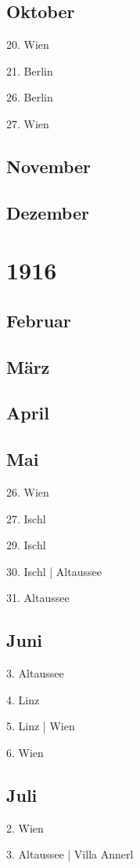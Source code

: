 \documentclass[twoside=false,titlepage=false,open=any, parskip=never, fontsize=10pt, headings=small, chapterprefix=false, appendixprefix=false, DIV=15]{scrbook}
\begin{document}
\begin{multicols}{3}
            \section*{Oktober}
            20. Wien\par
            21. Berlin\par
            26. Berlin\par
            27. Wien\par
            \section*{November}
            \section*{Dezember}
            \chapter*{1916}
            \section*{Februar}
            \section*{März}
            \section*{April}
            \section*{Mai}
            26. Wien\par
            27. Ischl\par
            29. Ischl\par
            30. Ischl | Altaussee\par
            31. Altaussee\par
            \section*{Juni}
            3. Altaussee\par
            4. Linz\par
            5. Linz | Wien\par
            6. Wien\par
            \section*{Juli}
            2. Wien\par
            3. Altaussee | Villa Annerl\par

\end{multicols}
\end{document}
